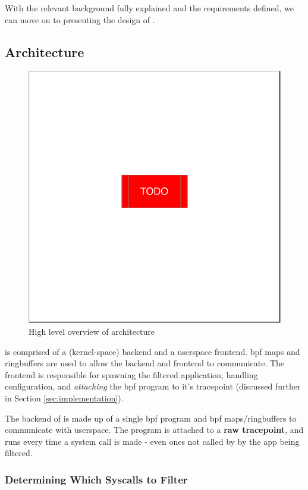 With the relevant background fully explained and the requirements defined, we
can move on to presenting the design of \afss.~ 

\subsection{Architecture} \label{subsec:arch}

\begin{figure}[h]
    \centering
    \includegraphics[width=0.8 \linewidth]{./diagrams/TODO.pdf} 
    \caption{High level overview of \afg architecture}
    \label{fig:arch-overview}
\end{figure}

\af is comprised of a (kernel-space) backend and a userspace frontend.
\ac{bpf} maps and ringbuffers are used to allow the backend and frontend to
communicate. The frontend is responsible for spawning the filtered application,
handling configuration, and \textit{attaching} the \ac{bpf} program to it's
tracepoint (discussed further in Section \ref{sec:implementation}).

The backend of \af is made up of a single \ac{bpf} program and \ac{bpf}
maps/ringbuffers to communicate with userspace.
The program is attached to a \textbf{raw tracepoint}, and runs every time
a system call is made - even ones not called by by the app being filtered.

\subsubsection{Determining Which Syscalls to Filter}

